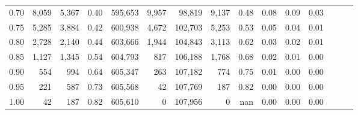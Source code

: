 \begin{tabular}{rrrrrrrrrrrrrrr}
0.70 &    8,059 &   5,367 &  0.40 &  595,653 &    9,957 &   98,819 &    9,137 &  0.48 &  0.08 &  0.09 &      0.03 \\
0.75 &    5,285 &   3,884 &  0.42 &  600,938 &    4,672 &  102,703 &    5,253 &  0.53 &  0.05 &  0.04 &      0.01 \\
0.80 &    2,728 &   2,140 &  0.44 &  603,666 &    1,944 &  104,843 &    3,113 &  0.62 &  0.03 &  0.02 &      0.01 \\
0.85 &    1,127 &   1,345 &  0.54 &  604,793 &      817 &  106,188 &    1,768 &  0.68 &  0.02 &  0.01 &      0.00 \\
0.90 &      554 &     994 &  0.64 &  605,347 &      263 &  107,182 &      774 &  0.75 &  0.01 &  0.00 &      0.00 \\
0.95 &      221 &     587 &  0.73 &  605,568 &       42 &  107,769 &      187 &  0.82 &  0.00 &  0.00 &      0.00 \\
1.00 &       42 &     187 &  0.82 &  605,610 &        0 &  107,956 &        0 &   nan &  0.00 &  0.00 &      0.00 \\
\bottomrule
\end{tabular}
